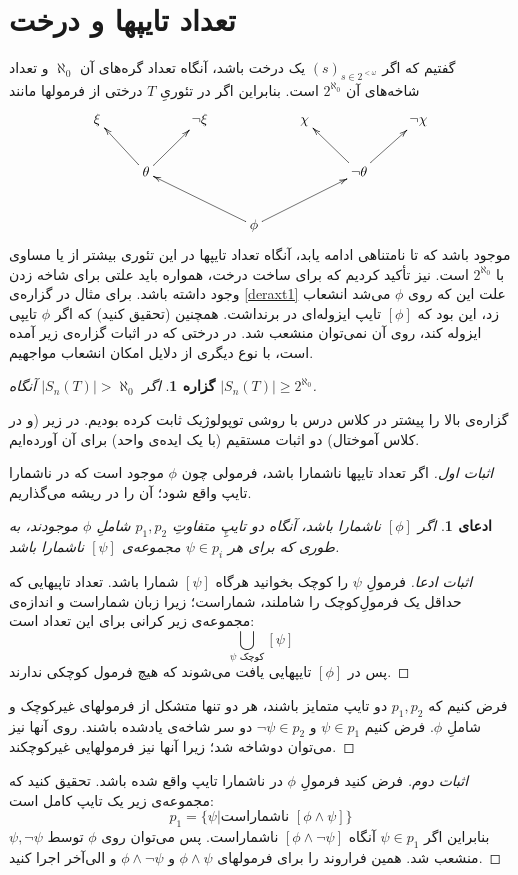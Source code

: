\documentclass[12pt,a4paper]{report}
\theoremstyle{colorhead}
\newtheorem{prop}[thm]{گزاره}
\newtheorem{claim}[thm]{ادعای}
\begin{document}
\section*{تعداد تایپها و درخت}
گفتیم که اگر
$(s)_{s\in 2^{<\omega}}$
یک درخت باشد، آنگاه تعداد گره‌های آن
$\aleph_0$
و تعداد شاخه‌های آن
$2^{\aleph_0}$
است. بنابراین اگر در تئوریِ
$T$
درختی از فرمولها مانند 
\[
\xymatrix{
\xi & & \neg \xi& & \chi & & \neg \chi\\
 & \theta\ar[ul]\ar[ur] & & & & \neg\theta\ar[ul]\ar[ur]& \\
 & & & \phi\ar[ull]\ar[urr]& & & \\
}
\]
موجود باشد که تا نامتناهی ادامه یابد،‌ آنگاه تعداد تایپها در این تئوری بیشتر از یا مساوی با 
$2^{\aleph_0}$
است. نیز تأکید کردیم که برای ساخت درخت، همواره باید علتی برای شاخه زدن وجود داشته باشد. برای مثال در گزاره‌ی
\ref{deraxt1}
علت این که روی
$\phi$
می‌شد انشعاب زد،‌ این بود که 
$[\phi]$
تایپ ایزوله‌ای در برنداشت. همچنین (تحقیق کنید) که اگر
$\phi$
تایپی ایزوله کند، روی آن نمی‌توان منشعب شد. در درختی که در اثبات گزاره‌ی زیر آمده است، با نوع دیگری از دلایل امکان انشعاب مواجهیم.
\begin{prop}
\label{deraxt2}
اگر
$|S_n(T)|>\aleph_0$
آنگاه
$|S_n(T)|\geq 2^{\aleph_0}$.
\end{prop}
گزاره‌ی بالا را پیشتر در کلاس درس با روشی توپولوژیک ثابت کرده بودیم. در زیر 
(و در کلاس آموختال) دو
 اثبات مستقیم (با یک ایده‌ی واحد) برای آن آورده‌ایم.
 \begin{proof}[اثبات اول]
اگر تعداد تایپها ناشمارا باشد، فرمولی چون
$\phi$
موجود است که در ناشمارا تایپ واقع شود؛ آن را در ریشه‌ می‌گذاریم. 
\begin{claim}
اگر
$[\phi]$
ناشمارا باشد، آنگاه دو تایپِ متفاوتِ
$p_1,p_2$
شاملِ
$\phi$
موجودند، به طوری که برای هر
$\psi\in p_i$
مجموعه‌ی
$[\psi]$
ناشمارا باشد. 
\end{claim} 
\begin{proof}[اثبات ادعا]
فرمولِ
$\psi$
را کوچک بخوانید هرگاه
$[\psi]$
شمارا باشد. تعداد تاپیهایی که حداقل یک فرمولِ‌کوچک را شاملند، شماراست؛ زیرا زبان شماراست و اندازه‌ی مجموعه‌ی زیر کرانی برای این تعداد است:
\[
\bigcup_{\text{$\psi$ کوچک}}[\psi]
\]
پس  در
$[\phi]$
تایپهایی یافت می‌شوند که هیچ فرمول کوچکی ندارند. 
\end{proof}
 فرض کنیم که
$p_1,p_2$
دو تایپ متمایز باشند، هر دو تنها متشکل از فرمولهای غیرکوچک و شاملِ
$\phi$.
فرض کنیم
$\psi\in p_1$
و
$\neg \psi\in p_2$
دو سر شاخه‌ی یادشده باشند. روی آنها نیز می‌توان دوشاخه شد؛ زیرا آنها نیز فرمولهایی غیرکوچکند. 
 \end{proof}
\begin{proof}[اثبات دوم]
فرض کنید فرمولِ
$\phi$
در ناشمارا تایپ واقع شده باشد. تحقیق کنید که مجموعه‌ی زیر یک تایپ کامل است:
\[
p_1=\{\psi| \text{ناشماراست }[\phi\wedge\psi]\}
\]
بنابراین اگر
$\psi\in p_1$
آنگاه
$[\phi\wedge\neg\psi]$
ناشماراست. پس می‌توان روی
$\phi$
توسط
$\psi,\neg\psi$
منشعب شد. همین فراروند را برای فرمولهای
$\phi\wedge\psi$
و 
$\phi\wedge\neg\psi$
و الی‌آخر اجرا کنید. 
\end{proof}
\pagebreak
\end{document}
